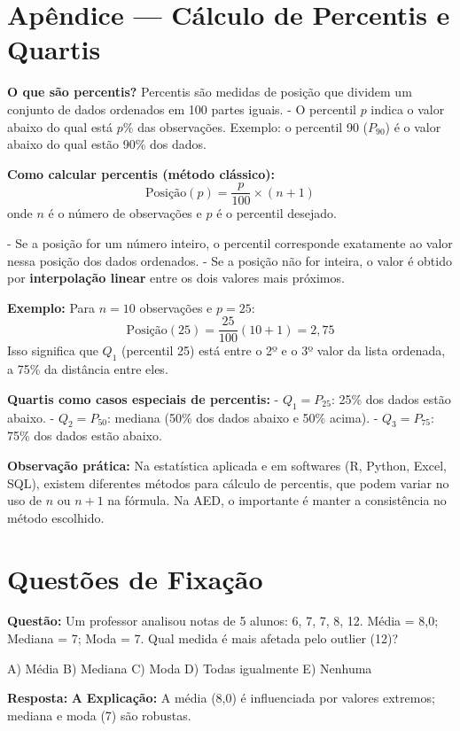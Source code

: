 \section*{Apêndice — Cálculo de Percentis e Quartis}
\begin{ProofBox}
\textbf{O que são percentis?}  
Percentis são medidas de posição que dividem um conjunto de dados ordenados em 100 partes iguais.  
- O percentil $p$ indica o valor abaixo do qual está $p\%$ das observações.  
Exemplo: o percentil 90 ($P_{90}$) é o valor abaixo do qual estão 90\% dos dados.  

\medskip
\textbf{Como calcular percentis (método clássico):}  
\[
\text{Posição}(p) = \frac{p}{100} \times (n+1)
\]
onde $n$ é o número de observações e $p$ é o percentil desejado.  

- Se a posição for um número inteiro, o percentil corresponde exatamente ao valor nessa posição dos dados ordenados.  
- Se a posição não for inteira, o valor é obtido por \textbf{interpolação linear} entre os dois valores mais próximos.  

\medskip
\textbf{Exemplo:}  
Para $n=10$ observações e $p=25$:  
\[
\text{Posição}(25) = \frac{25}{100}(10+1) = 2,75
\]  
Isso significa que $Q_1$ (percentil 25) está entre o 2º e o 3º valor da lista ordenada, a 75\% da distância entre eles.

\medskip
\textbf{Quartis como casos especiais de percentis:}  
- $Q_1 = P_{25}$: 25\% dos dados estão abaixo.  
- $Q_2 = P_{50}$: mediana (50\% dos dados abaixo e 50\% acima).  
- $Q_3 = P_{75}$: 75\% dos dados estão abaixo.  

\medskip
\textbf{Observação prática:}  
Na estatística aplicada e em softwares (R, Python, Excel, SQL), existem diferentes métodos para cálculo de percentis, que podem variar no uso de $n$ ou $n+1$ na fórmula.  
Na AED, o importante é manter a consistência no método escolhido.
\end{ProofBox}

\section*{Questões de Fixação}

\begin{SolvedBox}[title=Questão de Fixação 1 - Medidas de Tendência Central]
\textbf{Questão:} Um professor analisou notas de 5 alunos: 6, 7, 7, 8, 12. Média = 8,0; Mediana = 7; Moda = 7. Qual medida é mais afetada pelo outlier (12)?

A) Média  
B) Mediana  
C) Moda  
D) Todas igualmente  
E) Nenhuma

\textbf{Resposta:} \textbf{A}  
\textbf{Explicação:} A média (8,0) é influenciada por valores extremos; mediana e moda (7) são robustas.
\end{SolvedBox}

